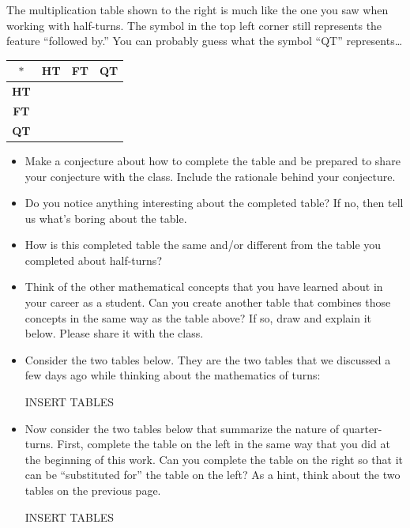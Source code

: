 \documentclass[11pt]{article}
\newenvironment{task}
	{\begin{mdframed}[linecolor=lightgray, linewidth=3pt]\raggedright}
	{\end{mdframed}}
\theoremstyle{definition}
\begin{document}
The multiplication table shown to the right is much like the one you saw when working with half-turns.  The symbol in the top left corner still represents the feature ``followed by.'' You can 
probably guess what the symbol ``QT'' represents\dots
\begin{center}
  \begin{tabular}{|c|c|c|c|}\hline
    $\ast$      & \textbf{HT} & \textbf{FT} & \textbf{QT} \\ \hline
    \textbf{HT} &             &  & \\ \hline
    \textbf{FT} &             &  & \\  \hline
    \textbf{QT} &             &  & \\  \hline
  \end{tabular}
\end{center}
\begin{task}
\begin{itemize}
  \item Make a conjecture about how to complete the table and be prepared to share your conjecture with the class. Include the rationale behind your conjecture.
  \item Do you notice anything interesting about the completed table? If no, then tell us what’s boring about the table.
  \item How is this completed table the same and/or different from the table you completed about half-turns?
  \item Think of the other mathematical concepts that you have learned about in your career as a student. Can you create another table that combines those concepts in the same way as the table above? If so, 
    draw and explain it below. Please share it with the class.
  \item Consider the two tables below. They are the two tables that we discussed a few days ago while thinking about the mathematics of turns:
    \begin{center}
      INSERT TABLES
    \end{center}
  \item Now consider the two tables below that summarize the nature of quarter-turns. First, complete the table on the left in the same way that you did at the beginning of this work. Can 
    you complete the table on the right so that it can be ``substituted for'' the table on the left? As a hint, think about the two tables on the previous page.
    \begin{center}
      INSERT TABLES
    \end{center}
\end{itemize}
\end{task}
\end{document}
